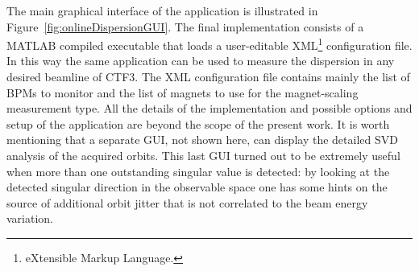 %
The main graphical interface of the application is illustrated in
Figure~\ref{fig:onlineDispersionGUI}.
The final implementation consists of a MATLAB compiled executable that loads a
user-editable XML\footnote{eXtensible Markup Language.} configuration file.
In this way the same application can be used to measure the dispersion in any desired
beamline of CTF3.
The XML configuration file contains mainly the list of BPMs to monitor and the list of
magnets to use for the magnet-scaling measurement type.
All the details of the implementation and possible options and setup of the application
are beyond the scope of the present work.
It is worth mentioning that a separate GUI, not shown here, can display the detailed SVD
analysis of the acquired orbits.
This last GUI turned out to be extremely useful when more than one outstanding singular
value is detected: 
by looking at the detected singular direction in the observable space one has some hints
on the source of additional orbit jitter that is not correlated to the beam energy
variation. 

